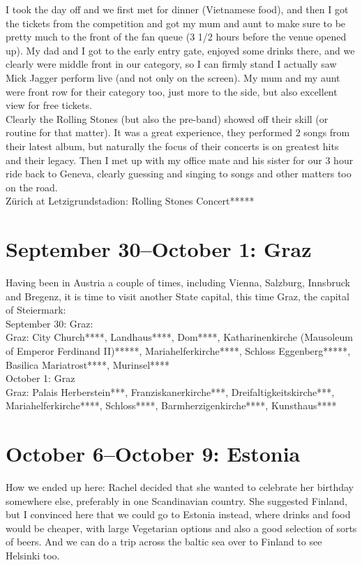 I took the day off and we first met for dinner (Vietnamese food), and then I got the tickets from the competition and got my mum and aunt to make sure to be pretty much to the front of the fan queue (3 1/2 hours before the venue opened up). My dad and I got to the early entry gate, enjoyed some drinks there, and we clearly were middle front in our category, so I can firmly stand I actually saw Mick Jagger perform live (and not only on the screen). My mum and my aunt were front row for their category too, just more to the side, but also excellent view for free tickets.\\
Clearly the Rolling Stones (but also the pre-band) showed off their skill (or routine for that matter). It was a great experience, they performed 2 songs from their latest album, but naturally the focus of their concerts is on greatest hits and their legacy. Then I met up with my office mate and his sister for our 3 hour ride back to Geneva, clearly guessing and singing to songs and other matters too on the road.\\

Z\"urich at Letzigrundstadion: Rolling Stones Concert*****

\section{September 30--October 1: Graz}
\label{Graz2017}

Having been in Austria a couple of times, including Vienna, Salzburg, Innsbruck and Bregenz, it is time to visit another State capital, this time Graz, the capital of Steiermark:\\

September 30: Graz:\\
Graz: City Church****, Landhaus****, Dom****, Katharinenkirche (Mausoleum of Emperor Ferdinand II)*****, Mariahelferkirche****, Schloss Eggenberg*****, Basilica Mariatrost****, Murinsel****\\

October 1: Graz\\
Graz: Palais Herberstein***, Franziskanerkirche***, Dreifaltigkeitskirche***, Mariahelferkirche****, Schloss****, Barmherzigenkirche****, Kunsthaus****

\section{October 6--October 9: Estonia}
\label{Estonia2017}

How we ended up here: Rachel decided that she wanted to celebrate her birthday somewhere else, preferably in one Scandinavian country. She suggested Finland, but I convinced here that we could go to Estonia instead, where drinks and food would be cheaper, with large Vegetarian options and also a good selection of sorts of beers. And we can do a trip across the baltic sea over to Finland to see Helsinki too.\\

